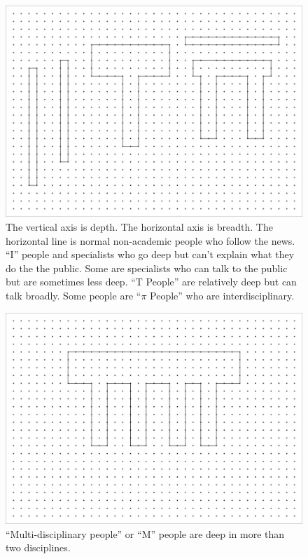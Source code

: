 \begin{figure}[h]
 \centering
 \includegraphics[width=1\textwidth]{pictures/JoiIllustr_V3-01.jpg}
 \caption[Image of shapes of disciplinary specialization.]{The vertical axis is depth. The horizontal axis is breadth. The horizontal line is normal non-academic people who follow the news. ``I'' people and specialists who go deep but can't explain what they do the the public. Some are specialists who can talk to the public but are sometimes less deep. ``T People'' are relatively deep but can talk broadly. Some people are ``$\pi$ People'' who are interdisciplinary.}
\label{fig:discipline001}
\end{figure}

\begin{figure}[h]
 \centering
 \includegraphics[width=1\textwidth]{pictures/JoiIllustr_V3-02.jpg}
 \caption{``Multi-disciplinary people'' or ``M'' people are deep in more than two disciplines.}
 \label{fig:discipline002}
\end{figure}

